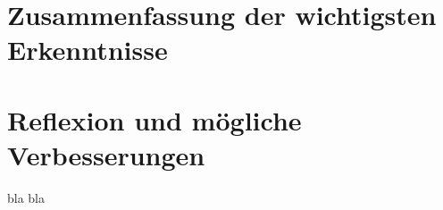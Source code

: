 \section{Zusammenfassung der wichtigsten Erkenntnisse}
\section{Reflexion und mögliche Verbesserungen}
bla bla
\clearpage